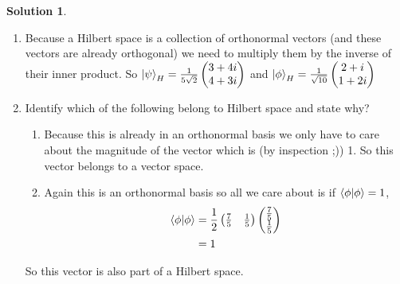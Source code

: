 \documentclass[10pt]{article}
\theoremstyle{definition}
\newtheorem{soln}{Solution}
\begin{document}
\begin{soln}~
  \begin{enumerate}[label=(\alph*)]
    \item Because a Hilbert space is a collection of orthonormal vectors (and these vectors are already orthogonal) we need to multiply them by the inverse of their inner product.
          So $\ket{\psi}_H=\frac{1}{5\sqrt{2}}\begin{pmatrix}
              3+4i \\
              4+3i
            \end{pmatrix}$ and $\ket{\phi}_H=\frac{1}{\sqrt{10}}\begin{pmatrix}
              2+i \\
              1+2i
            \end{pmatrix}$
    \item Identify which of the following belong to Hilbert space and state why?
          \begin{enumerate}[label=(\roman*)]
            \item Because this is already in an orthonormal basis we only have to care about the magnitude of the vector which is (by inspection ;)) 1.
                  So this vector belongs to a vector space.
            \item Again this is an orthonormal basis so all we care about is if $\braket{\phi}{\phi}=1$,
                  \begin{align*}
                    \braket{\phi}{\phi} & =
                    \frac{1}{2}
                    \begin{pmatrix}
                      \frac{7}{5} & \frac{1}{5}
                    \end{pmatrix}
                    \begin{pmatrix}
                      \frac{7}{5} \\
                      \frac{1}{5}
                    \end{pmatrix}            \\
                                        & = 1
                  \end{align*}
          \end{enumerate}
          So this vector is also part of a Hilbert space.
  \end{enumerate}
\end{soln}
\end{document}
